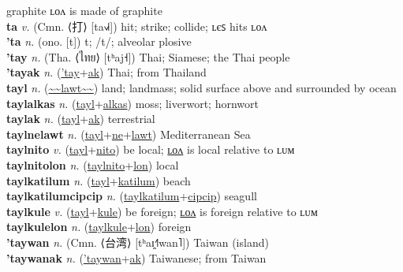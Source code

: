 graphite ʟᴏᴧ is made of graphite \label{tepatolon} \\
\textbf{ta} \textit{v.} (Cmn. ⟨打⟩ [ta˧˩˧])
hit; strike; collide; ʟєꜱ hits ʟᴏᴧ \label{ta} \\
\textbf{'ta} \textit{n.} (ono. [t])
t; /t/; alveolar plosive \label{'ta} \\
\textbf{'tay} \textit{n.} (Tha. ⟨ไทย⟩ [tʰaj˧])
Thai; Siamese; the Thai people \label{'tay} \\
\textbf{'tayak} \textit{n.} (\hyperref['tay]{'tay}+\hyperref[ak]{ak})
Thai; from Thailand \label{'tayak} \\
\textbf{tayl} \textit{n.} (\hyperref[lawt]{\~{}\~{}lawt\~{}\~{}})
land; landmass; solid surface above and surrounded by ocean \label{tayl} \\
\textbf{taylalkas} \textit{n.} (\hyperref[tayl]{tayl}+\hyperref[alkas]{alkas})
moss; liverwort; hornwort \label{taylalkas} \\
\textbf{taylak} \textit{n.} (\hyperref[tayl]{tayl}+\hyperref[ak]{ak})
terrestrial \label{taylak} \\
\textbf{taylnelawt} \textit{n.} (\hyperref[tayl]{tayl}+\hyperref[ne]{ne}+\hyperref[lawt]{lawt})
Mediterranean Sea \label{taylnelawt} \\
\textbf{taylnito} \textit{v.} (\hyperref[tayl]{tayl}+\hyperref[nito]{nito})
be local; \hyperref[taylnitolon]{ʟᴏᴧ} is local relative to ʟᴜᴍ \label{taylnito} \\
\textbf{taylnitolon} \textit{n.} (\hyperref[taylnito]{taylnito}+\hyperref[lon]{lon})
local \label{taylnitolon} \\
\textbf{taylkatilum} \textit{n.} (\hyperref[tayl]{tayl}+\hyperref[katilum]{katilum})
beach \label{taylkatilum} \\
\textbf{taylkatilumcipcip} \textit{n.} (\hyperref[taylkatilum]{taylkatilum}+\hyperref[cipcip]{cipcip})
seagull \label{taylkatilumcipcip} \\
\textbf{taylkule} \textit{v.} (\hyperref[tayl]{tayl}+\hyperref[kule]{kule})
be foreign; \hyperref[taylkulelon]{ʟᴏᴧ} is foreign relative to ʟᴜᴍ \label{taylkule} \\
\textbf{taylkulelon} \textit{n.} (\hyperref[taylkule]{taylkule}+\hyperref[lon]{lon})
foreign \label{taylkulelon} \\
\textbf{'taywan} \textit{n.} (Cmn. ⟨台湾⟩ [tʰaɪ̯˧˥wan˥])
Taiwan (island) \label{'taywan} \\
\textbf{'taywanak} \textit{n.} (\hyperref['taywan]{'taywan}+\hyperref[ak]{ak})
Taiwanese; from Taiwan \label{'taywanak} \\
